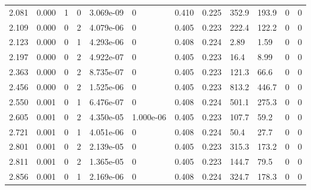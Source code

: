 \documentclass[preview]{standalone}
\begin{document}
{{\begin{tabular}{L{1.2cm}C{1.2cm} C{0.3cm}C{0.5cm} C{1.4cm}C{1.4cm} C{1.4cm}C{1.4cm} C{1.6cm}C{1.6cm} C{1.6cm}C{1.6cm}}
  2.081  &  0.000  & 1     &  0 &  3.069e-09  & 0  &  0.410&   0.225& 352.9 & 193.9   &  0 & 0  \\ 
  2.109  &  0.000  & 0     &  2 &  4.079e-06  & 0  &  0.405&   0.223& 222.4 & 122.2   &  0 & 0  \\ 
  2.123  &  0.000  & 0     &  1 &  4.293e-06  & 0  &  0.408&   0.224& 2.89 & 1.59   &  0 & 0  \\ 
  2.197  &  0.000  & 0     &  2 &  4.922e-07  & 0  &  0.405&   0.223& 16.4 & 8.99   &  0 & 0  \\ 
  2.363  &  0.000  & 0     &  2 &  8.735e-07  & 0  &  0.405&   0.223& 121.3 & 66.6   &  0 & 0  \\ 
  2.456  &  0.000  & 0     &  2 &  1.525e-06  & 0  &  0.405&   0.223& 813.2 & 446.7   &  0 & 0  \\ 
  2.550  &  0.001  & 0     &  1 &  6.476e-07  & 0  &  0.408&   0.224& 501.1 & 275.3   &  0 & 0  \\ 
  2.605  &  0.001  & 0     &  2 &  4.350e-05  & 1.000e-06  &  0.405&   0.223& 107.7 & 59.2   &  0 & 0  \\ 
  2.721  &  0.001  & 0     &  1 &  4.051e-06  & 0  &  0.408&   0.224& 50.4 & 27.7   &  0 & 0  \\ 
  2.801  &  0.001  & 0     &  2 &  2.139e-05  & 0  &  0.405&   0.223& 315.3 & 173.2   &  0 & 0  \\ 
  2.811  &  0.001  & 0     &  2 &  1.365e-05  & 0  &  0.405&   0.223& 144.7 & 79.5   &  0 & 0  \\ 
  2.856  &  0.001  & 0     &  1 &  2.169e-06  & 0  &  0.408&   0.224& 324.7 & 178.3   &  0 & 0  \\ 
\hline 
\end{tabular} 

}}
\end{document}
